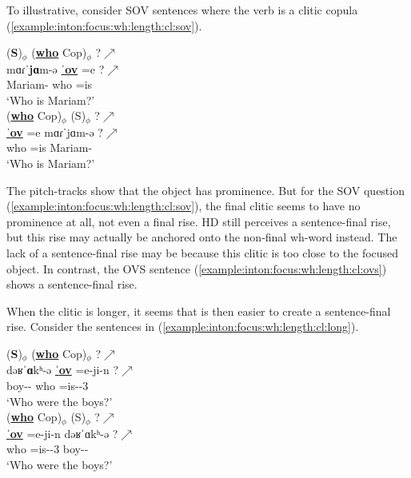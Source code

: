 To illustrative, consider SOV     sentences where the verb is a clitic copula (\ref{example:inton:focus:wh:length:cl:sov}).  

\begin{exe}
	\ex \begin{xlist}
		\ex \glll (\textbf{S})$_\phi$ (\underline{\textbf{who}} Cop)$_\phi$ ?$\nearrow$ \\
		mɑɾˈ\textbf{jɑ}m-ə  \underline{ˈ\textbf{ov}} =e ?$\nearrow$ \\
		Mariam-{} who =is \\
		\trans `Who is Mariam?'
		\label{example:inton:focus:wh:length:cl:sov}
		\\ 
		\ex \glll (\underline{\textbf{who}} Cop)$_\phi$ ({S})$_\phi$  ?$\nearrow$ \\
		\underline{ˈ\textbf{ov}} =e mɑɾˈ{jɑ}m-ə   ?$\nearrow$ \\
		who  =is  Mariam-{} \\
		\trans `Who is Mariam?'
		\label{example:inton:focus:wh:length:cl:ovs}
		\\ 
		
	\end{xlist}
\end{exe}

The pitch-tracks show that the object has prominence.  But   for the SOV question (\ref{example:inton:focus:wh:length:cl:sov}),   the final clitic seems to have no prominence at all, not even a final rise. HD still perceives a sentence-final rise, but this rise may actually be anchored onto the non-final wh-word instead. The lack of a sentence-final rise may be because this clitic is too close to the focused object.  In contrast, the OVS sentence (\ref{example:inton:focus:wh:length:cl:ovs}) shows a sentence-final rise. 

When the clitic is longer, it seems that is then easier to create a sentence-final rise. Consider the sentences in (\ref{example:inton:focus:wh:length:cl:long}). 



\begin{exe}
	\ex \label{example:inton:focus:wh:length:cl:long} \begin{xlist}
		\ex \glll (\textbf{S})$_\phi$ (\underline{\textbf{who}} Cop)$_\phi$ ?$\nearrow$ \\
		dəʁˈ\textbf{ɑ}kʰ-ə  \underline{ˈ\textbf{ov}} =e-ji-n ?$\nearrow$ \\
		boy-{\pl}-{} who =is-{\pst}-3{\pl} \\
		\trans `Who were the boys?'
		\\ \armenian{Տղաքը ո՞վ էին։}
		\ex \glll (\underline{\textbf{who}} Cop)$_\phi$ ({S})$_\phi$  ?$\nearrow$ \\
		\underline{ˈ\textbf{ov}} =e-ji-n dəʁˈ{ɑ}kʰ-ə   ?$\nearrow$ \\
		who =is-{\pst}-3{\pl} boy-{\pl}-{}  \\
		\trans `Who were the boys?'
		\\ \armenian{Ո՞վ էին տղաքը։}
		
	\end{xlist}
\end{exe}

